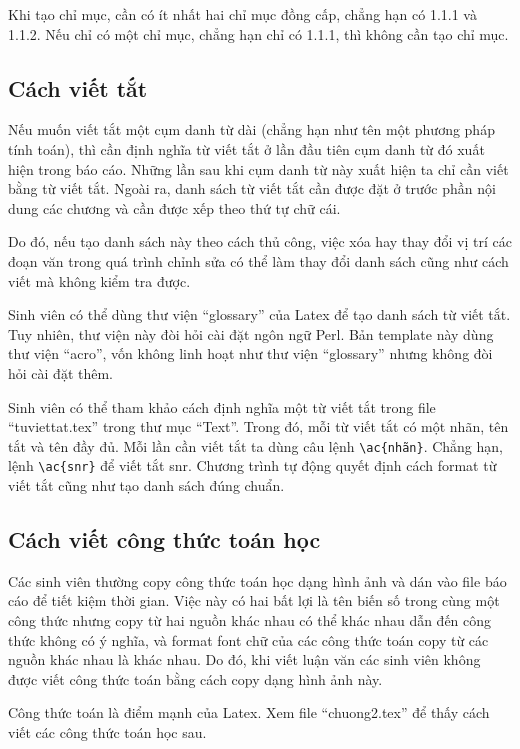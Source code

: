	Khi tạo chỉ mục, cần có ít nhất hai chỉ mục đồng cấp, chẳng hạn có 1.1.1 và 1.1.2. 
	Nếu chỉ có một chỉ mục, chẳng hạn chỉ có 1.1.1, thì không cần tạo chỉ mục.
	
	\subsection{Cách viết tắt}
	
	Nếu muốn viết tắt một cụm danh từ dài (chẳng hạn như tên một phương pháp tính toán), thì cần định nghĩa từ viết tắt ở lần đầu tiên cụm danh từ đó xuất hiện trong báo cáo.
	Những lần sau khi cụm danh từ này xuất hiện ta chỉ cần viết bằng từ viết tắt.
	Ngoài ra, danh sách từ viết tắt cần được đặt ở trước phần nội dung các chương và cần được xếp theo thứ tự chữ cái.
	
	Do đó, nếu tạo danh sách này theo cách thủ công, việc xóa hay thay đổi vị trí các đoạn văn trong quá trình chỉnh sửa có thể làm thay đổi danh sách cũng như cách viết mà không kiểm tra được.
	
	Sinh viên có thể dùng thư viện ``glossary'' của Latex để tạo danh sách từ viết tắt. 
	Tuy nhiên, thư viện này đòi hỏi cài đặt ngôn ngữ Perl.
	Bản template này dùng thư viện ``acro'', vốn không linh hoạt như thư viện ``glossary'' nhưng không đòi hỏi cài đặt thêm.
	
	Sinh viên có thể tham khảo cách định nghĩa một từ viết tắt trong file ``tuviettat.tex'' trong thư mục ``Text''.
	Trong đó, mỗi từ viết tắt có một nhãn, tên tắt và tên đầy đủ.
	Mỗi lần cần viết tắt ta dùng câu lệnh \verb|\ac{nhãn}|.
	Chẳng hạn, lệnh \verb|\ac{snr}| để viết tắt \ac{snr}.
	Chương trình tự động quyết định cách format từ viết tắt cũng như tạo danh sách đúng chuẩn.
	
	\subsection{Cách viết công thức toán học} 

	Các sinh viên thường copy công thức toán học dạng hình ảnh và dán vào file báo cáo để tiết kiệm thời gian.
	Việc này có hai bất lợi là tên biến số trong cùng một công thức nhưng copy từ hai nguồn khác nhau có thể khác nhau dẫn đến công thức không có ý nghĩa, và format font chữ của các công thức toán copy từ các nguồn khác nhau là khác nhau.
	Do đó, khi viết luận văn các sinh viên không được viết công thức toán bằng cách copy dạng hình ảnh này.
	
	Công thức toán là điểm mạnh của Latex. 
	Xem file ``chuong2.tex'' để thấy cách viết các công thức toán học sau.
	
